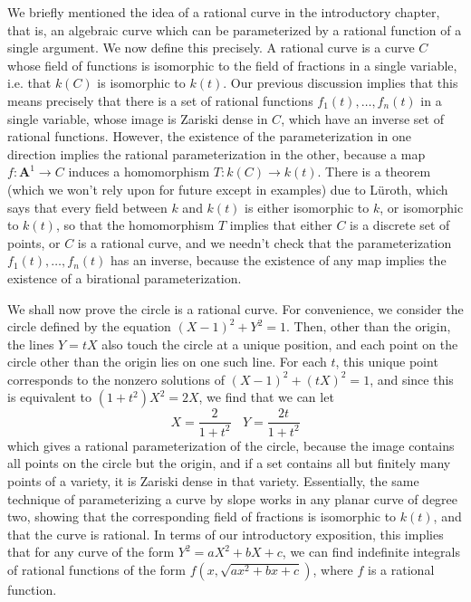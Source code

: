 We briefly mentioned the idea of a rational curve in the introductory chapter, that is, an algebraic curve which can be parameterized by a rational function of a single argument. We now define this precisely. A rational curve is a curve $C$ whose field of functions is isomorphic to the field of fractions in a single variable, i.e. that $k(C)$ is isomorphic to $k(t)$. Our previous discussion implies that this means precisely that there is a set of rational functions $f_1(t), \dots, f_n(t)$ in a single variable, whose image is Zariski dense in $C$, which have an inverse set of rational functions. However, the existence of the parameterization in one direction implies the rational parameterization in the other, because a map $f: \mathbf{A}^1 \to C$ induces a homomorphism $T: k(C) \to k(t)$. There is a theorem (which we won't rely upon for future except in examples) due to L\"{u}roth, which says that every field between $k$ and $k(t)$ is either isomorphic to $k$, or isomorphic to $k(t)$, so that the homomorphism $T$ implies that either $C$ is a discrete set of points, or $C$ is a rational curve, and we needn't check that the parameterization $f_1(t), \dots, f_n(t)$ has an inverse, because the existence of any map implies the existence of a birational parameterization.

\begin{example}
    We shall now prove the circle is a rational curve. For convenience, we consider the circle defined by the equation $(X-1)^2 + Y^2 = 1$. Then, other than the origin, the lines $Y = tX$ also touch the circle at a unique position, and each point on the circle other than the origin lies on one such line. For each $t$, this unique point corresponds to the nonzero solutions of $(X-1)^2 + (tX)^2 = 1$, and since this is equivalent to $(1+t^2)X^2 = 2X$, we find that we can let
    \[ X = \frac{2}{1 + t^2}\ \ \ \ Y = \frac{2t}{1+t^2} \]
    which gives a rational parameterization of the circle, because the image contains all points on the circle but the origin, and if a set contains all but finitely many points of a variety, it is Zariski dense in that variety. Essentially, the same technique of parameterizing a curve by slope works in any planar curve of degree two, showing that the corresponding field of fractions is isomorphic to $k(t)$, and that the curve is rational. In terms of our introductory exposition, this implies that for any curve of the form $Y^2 = aX^2 + bX + c$, we can find indefinite integrals of rational functions of the form $f(x,\sqrt{ax^2 + bx + c})$, where $f$ is a rational function.
\end{example}

